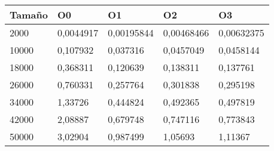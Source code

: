 \begin{tabular}{|l|l|l|l|l|}
	\hline
	Tamaño & O0 & O1 & O2 & O3 \\
	\hline
	\hline
	2000 & 0,0044917 & 0,00195844 & 0,00468466 & 0,00632375 \\
	\hline
	10000 & 0,107932 & 0,037316 & 0,0457049 & 0,0458144 \\
	\hline
	18000 & 0,368311 & 0,120639 & 0,138311 & 0,137761 \\
	\hline
	26000 & 0,760331 & 0,257764 & 0,301838 & 0,295198 \\
	\hline
	34000 & 1,33726 & 0,444824 & 0,492365 & 0,497819 \\
	\hline
	42000 & 2,08887 & 0,679748 & 0,747116 & 0,773843 \\
	\hline
	50000 & 3,02904 & 0,987499 & 1,05693 & 1,11367 \\
	\hline
\end{tabular}
